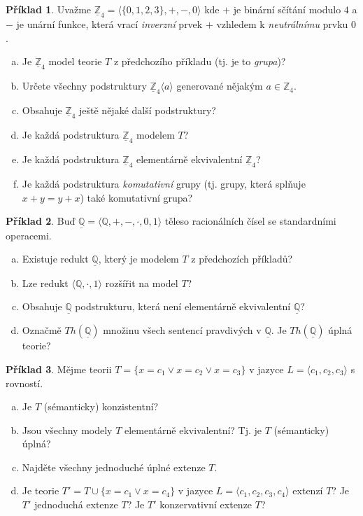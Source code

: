 \documentclass{amsart}
\theoremstyle{definition}
\newtheorem{problem}{Příklad}
\begin{document}
\bigskip\begin{problem}
Uvažme $\underline{\mathbb{Z}}_4=\langle\{0,1,2,3\},+,-,0 \rangle$ kde $+$ je binární sčítání modulo $4$ a $-$ je unární funkce, která vrací \emph{inverzní} prvek $+$ vzhledem k \emph{neutrálnímu} prvku $0$.
    \begin{enumerate}[(a)]
    \item Je $\underline{\mathbb{Z}}_4$ model teorie $T$ z předchozího příkladu (tj. je to \emph{grupa})?
    \item Určete všechny podstruktury $\underline{\mathbb{Z}}_4\langle a\rangle$ generované nějakým $a\in \mathbb{Z}_4$.
    \item Obsahuje $\underline{\mathbb{Z}}_4$ ještě nějaké další podstruktury?
    \item Je každá podstruktura $\underline{\mathbb{Z}}_4$ modelem $T$?
    \item Je každá podstruktura $\underline{\mathbb{Z}}_4$ elementárně ekvivalentní $\underline{\mathbb{Z}}_4$?
    \item Je každá podstruktura \emph{komutativní} grupy (tj. grupy, která splňuje $x+y=y+x$) také komutativní grupa?
    \end{enumerate}
\end{problem}  
    
\bigskip\begin{problem}Buď $\underline{\mathbb{Q}}=\langle\mathbb{Q},+,-,\cdot,0,1 \rangle$ těleso racionálních čísel se standardními operacemi.
\begin{enumerate}[(a)]
\item Existuje redukt $\underline{\mathbb{Q}}$, který je modelem $T$ z předchozích příkladů?
\item Lze redukt $\langle\mathbb{Q},\cdot,1\rangle$ rozšířit na model $T$?
\item Obsahuje $\underline{\mathbb{Q}}$ podstrukturu, která není elementárně ekvivalentní $\underline{\mathbb{Q}}$?
\item Označmě $Th(\underline{\mathbb{Q}})$ množinu všech sentencí pravdivých v $\underline{\mathbb{Q}}$. Je $Th(\underline{\mathbb{Q}})$ úplná teorie?
\end{enumerate}
\end{problem}

\bigskip\begin{problem}
Mějme teorii $T=\{x=c_1 \vee x=c_2 \vee x=c_3\}$ v jazyce $L=\langle c_1,c_2,c_3\rangle$ s rovností.
\begin{enumerate}[(a)]
\item Je $T$ (sémanticky) konzistentní?
\item Jsou všechny modely $T$ elementárně ekvivalentní? Tj. je $T$ (sémanticky) úplná?
\item Najděte všechny jednoduché úplné extenze $T$.
\item Je teorie $T'=T\cup\{x=c_1 \vee x=c_4\}$ v jazyce $L=\langle c_1,c_2,c_3,c_4\rangle$ extenzí $T$? Je $T'$ jednoduchá extenze $T$? Je $T'$ konzervativní extenze $T$?
\end{enumerate}
\end{problem}
\end{document}
